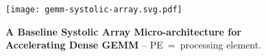 \begin{figure}[ht]
    \centering
    \texttt{[image: gemm-systolic-array.svg.pdf]}
    \caption[Baseline Systolic Array for Accelerating Dense GEMM]{
      \textbf{A Baseline Systolic Array Micro-architecture for Accelerating
      Dense GEMM} -- PE~=~processing element.
    }
    \label{fig-spz-gemm-systolic-array}
\end{figure}
